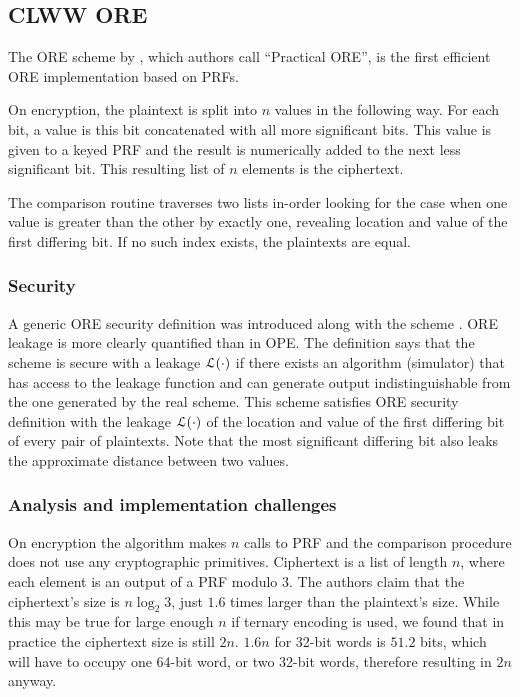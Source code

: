 \subsection{CLWW ORE}\label{sec:clww}

	The ORE scheme by \textcite{clww-ore}, which authors call ``Practical ORE'', is the first efficient ORE implementation based on PRFs.

	On encryption, the plaintext is split into $n$ values in the following way.
	For each bit, a value is this bit concatenated with all more significant bits.
	This value is given to a keyed PRF and the result is numerically added to the next less significant bit.
	This resulting list of $n$ elements is the ciphertext.

	The comparison routine traverses two lists in-order looking for the case when one value is greater than the other by exactly one, revealing location and value of the first differing bit.
	If no such index exists, the plaintexts are equal.

	\subsubsection{Security}
		A generic ORE security definition was introduced along with the scheme \cite{clww-ore}.
		ORE leakage is more clearly quantified than in OPE\@.
		The definition says that the scheme is secure with a leakage $\mathcal{L}(\cdot)$ if there exists an algorithm (simulator) that has access to the leakage function and can generate output indistinguishable from the one generated by the real scheme.
		This scheme satisfies ORE security definition with the leakage $\mathcal{L}(\cdot)$ of the location and value of the first differing bit of every pair of plaintexts.
		Note that the most significant differing bit also leaks the approximate distance between two values.

	\subsubsection{Analysis and implementation challenges}

		On encryption the algorithm makes $n$ calls to PRF and the comparison procedure does not use any cryptographic primitives.
		Ciphertext is a list of length $n$, where each element is an output of a PRF modulo 3.
		The authors claim that the ciphertext's size is $n \log_2 3$, just $1.6$ times larger than the plaintext's size.
		While this may be true for large enough $n$ if ternary encoding is used, we found that in practice the ciphertext size is still $2n$.
		$1.6 n$ for 32-bit words is $51.2$ bits, which will have to occupy one 64-bit word, or two 32-bit words, therefore resulting in $2n$ anyway.

